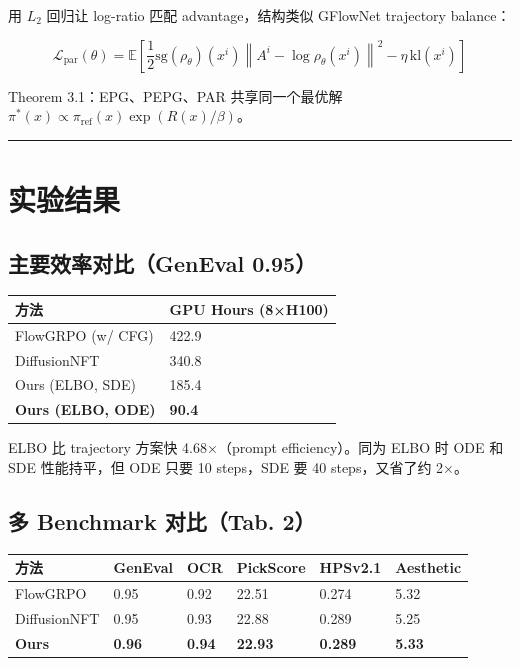 用 \(L_2\) 回归让 log-ratio 匹配 advantage，结构类似 GFlowNet trajectory balance：

\[
\mathcal{L}_\mathrm{par}(\theta) = \mathbb{E}\!\left[\frac{1}{2}\mathrm{sg}(\rho_\theta)(x^i)\left\|A^i - \log \rho_\theta(x^i)\right\|^2 - \eta\, \mathrm{kl}(x^i)\right]
\]

Theorem 3.1：EPG、PEPG、PAR 共享同一个最优解 \(\pi^*(x) \propto \pi_\mathrm{ref}(x)\exp(R(x)/\beta)\)。

\hrule

\section{实验结果}

\subsection{主要效率对比（GenEval 0.95）}

\begin{center}
\begin{tabular}{ll}
\toprule
方法 & GPU Hours (8×H100) \\
\midrule
FlowGRPO (w/ CFG) & 422.9 \\
DiffusionNFT & 340.8 \\
Ours (ELBO, SDE) & 185.4 \\
\textbf{Ours (ELBO, ODE)} & \textbf{90.4} \\
\bottomrule
\end{tabular}
\end{center}

ELBO 比 trajectory 方案快 4.68×（prompt efficiency）。同为 ELBO 时 ODE 和 SDE 性能持平，但 ODE 只要 10 steps，SDE 要 40 steps，又省了约 2×。

\subsection{多 Benchmark 对比（Tab. 2）}

\begin{center}
\begin{tabular}{llllll}
\toprule
方法 & GenEval & OCR & PickScore & HPSv2.1 & Aesthetic \\
\midrule
FlowGRPO & 0.95 & 0.92 & 22.51 & 0.274 & 5.32 \\
DiffusionNFT & 0.95 & 0.93 & 22.88 & 0.289 & 5.25 \\
\textbf{Ours} & \textbf{0.96} & \textbf{0.94} & \textbf{22.93} & \textbf{0.289} & \textbf{5.33} \\
\bottomrule
\end{tabular}
\end{center}

